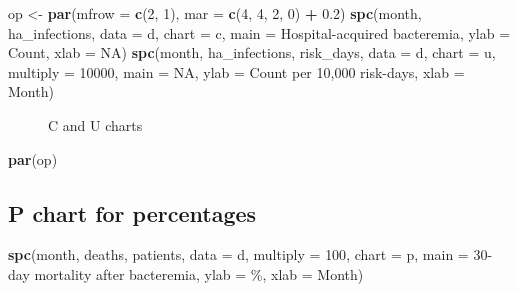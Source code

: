 \documentclass[
]{book}
\makeatletter
\newenvironment{Shaded}{\begin{snugshade}}{\end{snugshade}}
\newcommand{\AttributeTok}[1]{\textcolor[rgb]{0.13,0.29,0.53}{#1}}
\newcommand{\ConstantTok}[1]{\textcolor[rgb]{0.56,0.35,0.01}{#1}}
\newcommand{\DecValTok}[1]{\textcolor[rgb]{0.00,0.00,0.81}{#1}}
\newcommand{\FloatTok}[1]{\textcolor[rgb]{0.00,0.00,0.81}{#1}}
\newcommand{\FunctionTok}[1]{\textcolor[rgb]{0.13,0.29,0.53}{\textbf{#1}}}
\newcommand{\NormalTok}[1]{#1}
\newcommand{\OtherTok}[1]{\textcolor[rgb]{0.56,0.35,0.01}{#1}}
\newcommand{\SpecialCharTok}[1]{\textcolor[rgb]{0.81,0.36,0.00}{\textbf{#1}}}
\newcommand{\StringTok}[1]{\textcolor[rgb]{0.31,0.60,0.02}{#1}}
\newcommand*\pandocbounded[1]{%
  \sbox\pandoc@box{#1}%
  \Gscale@div\@tempa{\textheight}{\dimexpr\ht\pandoc@box+\dp\pandoc@box\relax}%
  \Gscale@div\@tempb{\linewidth}{\wd\pandoc@box}%
  \ifdim\@tempb\p@<\@tempa\p@\let\@tempa\@tempb\fi%
  \ifdim\@tempa\p@<\p@\scalebox{\@tempa}{\usebox\pandoc@box}%
  \else\usebox{\pandoc@box}%
  \fi%
}
\makeatother
\begin{document}
\begin{Shaded}
\begin{Highlighting}[]
\NormalTok{op }\OtherTok{\textless{}{-}} \FunctionTok{par}\NormalTok{(}\AttributeTok{mfrow =} \FunctionTok{c}\NormalTok{(}\DecValTok{2}\NormalTok{, }\DecValTok{1}\NormalTok{),}
          \AttributeTok{mar   =} \FunctionTok{c}\NormalTok{(}\DecValTok{4}\NormalTok{, }\DecValTok{4}\NormalTok{, }\DecValTok{2}\NormalTok{, }\DecValTok{0}\NormalTok{) }\SpecialCharTok{+} \FloatTok{0.2}\NormalTok{)}
\FunctionTok{spc}\NormalTok{(month, ha\_infections,}
    \AttributeTok{data =}\NormalTok{ d,}
    \AttributeTok{chart    =} \StringTok{\textquotesingle{}c\textquotesingle{}}\NormalTok{,}
    \AttributeTok{main     =} \StringTok{\textquotesingle{}Hospital{-}acquired bacteremia\textquotesingle{}}\NormalTok{,}
    \AttributeTok{ylab     =} \StringTok{\textquotesingle{}Count\textquotesingle{}}\NormalTok{,}
    \AttributeTok{xlab     =} \ConstantTok{NA}\NormalTok{)}
\FunctionTok{spc}\NormalTok{(month, ha\_infections, risk\_days,}
    \AttributeTok{data     =}\NormalTok{ d,}
    \AttributeTok{chart    =} \StringTok{\textquotesingle{}u\textquotesingle{}}\NormalTok{,}
    \AttributeTok{multiply =} \DecValTok{10000}\NormalTok{,}
    \AttributeTok{main     =} \ConstantTok{NA}\NormalTok{,}
    \AttributeTok{ylab     =} \StringTok{\textquotesingle{}Count per 10,000 risk{-}days\textquotesingle{}}\NormalTok{,}
    \AttributeTok{xlab     =} \StringTok{\textquotesingle{}Month\textquotesingle{}}\NormalTok{)}
\end{Highlighting}
\end{Shaded}

\begin{figure}
\centering
\pandocbounded{}
\caption{C and U charts}
\end{figure}

\begin{Shaded}
\begin{Highlighting}[]
\FunctionTok{par}\NormalTok{(op)}
\end{Highlighting}
\end{Shaded}

\subsection{P chart for percentages}\label{p-chart-for-percentages}

\begin{Shaded}
\begin{Highlighting}[]
\FunctionTok{spc}\NormalTok{(month, deaths, patients,}
    \AttributeTok{data     =}\NormalTok{ d,}
    \AttributeTok{multiply =} \DecValTok{100}\NormalTok{,}
    \AttributeTok{chart    =} \StringTok{\textquotesingle{}p\textquotesingle{}}\NormalTok{,}
    \AttributeTok{main     =} \StringTok{\textquotesingle{}30{-}day mortality after bacteremia\textquotesingle{}}\NormalTok{,}
    \AttributeTok{ylab     =} \StringTok{\textquotesingle{}\%\textquotesingle{}}\NormalTok{,}
    \AttributeTok{xlab     =} \StringTok{\textquotesingle{}Month\textquotesingle{}}\NormalTok{)}
\end{Highlighting}
\end{Shaded}
\end{document}
